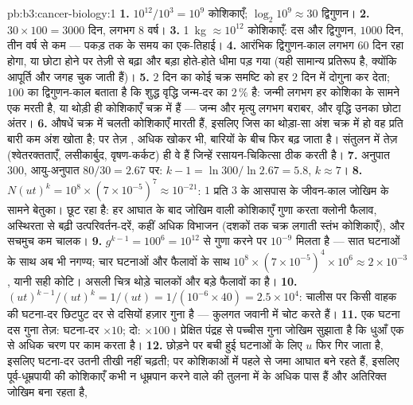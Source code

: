 \begin{solution}{pb:b3:cancer-biology:1}
\textbf{1.} $10^{12}/10^{3} = 10^{9}$ कोशिकाएँ; $\log_{2}10^{9} \approx 30$
द्विगुणन।
\textbf{2.} $30\times 100 = 3000$ दिन, लगभग $8$ वर्ष।
\textbf{3.} \qty{1}{kg} $\approx 10^{12}$ कोशिकाएँ: दस और द्विगुणन,
$1000$ दिन, तीन वर्ष से कम --- पकड़ तक के समय का एक-तिहाई।
\textbf{4.} आरंभिक द्विगुणन-काल लगभग $60$ दिन रहा होगा, या  छोटा
होने पर तेज़ी से बढ़ा और बड़ा होते-होते धीमा पड़ गया (यही सामान्य
प्रतिरूप है, क्योंकि आपूर्ति और जगह चुक जाती हैं)।
\textbf{5.} $2$ दिन का कोई चक्र समष्टि को हर $2$ दिन में दोगुना कर
देता; $100$ का द्विगुणन-काल बताता है कि शुद्ध वृद्धि जन्म-दर का
$2\,\%$ है: जन्मी लगभग हर कोशिका के सामने एक मरती है, या थोड़ी ही
कोशिकाएँ चक्र में हैं --- जन्म और मृत्यु लगभग बराबर, और वृद्धि उनका
छोटा अंतर।
\textbf{6.} औषधें चक्र में चलती कोशिकाएँ मारती हैं, इसलिए जिस 
का थोड़ा-सा अंश चक्र में हो वह प्रति बारी कम अंश खोता है; पर तेज़
, अधिक खोकर भी, बारियों के बीच फिर बढ़ जाता है। संतुलन में तेज़
 (श्वेतरक्तताएँ, लसीकार्बुद, वृषण-कर्कट) ही वे हैं जिन्हें
रसायन-चिकित्सा ठीक करती है।
\textbf{7.} अनुपात $300$, आयु-अनुपात $80/30 = 2.67$ पर: $k - 1 =
\ln 300/\ln 2.67 = 5.8$, $k \approx 7$।
\textbf{8.} $N(ut)^{k} = 10^{8}\times (7\times 10^{-5})^{7} \approx
10^{-21}$: $1$ प्रति $3$ के आसपास के जीवन-काल जोखिम के सामने बेतुका।
छूट रहा है: हर आघात के बाद जोखिम वाली कोशिकाएँ गुणा करता क्लोनी फैलाव,
अस्थिरता से बढ़ी उत्परिवर्तन-दरें, कहीं अधिक विभाजन (दशकों तक चक्र
लगाती स्तंभ कोशिकाएँ), और सचमुच कम चालक।
\textbf{9.} $g^{k-1} = 100^{6} = 10^{12}$ से गुणा करने पर $10^{-9}$
मिलता है --- सात घटनाओं के साथ अब भी नगण्य; चार घटनाओं और फैलावों के
साथ $10^{8}\times (7\times 10^{-5})^{4}\times 10^{6} \approx 2\times
10^{-3}$, यानी सही कोटि। असली चित्र थोड़े चालकों और बड़े फैलावों का है।
\textbf{10.} $(ut)^{k-1}/(ut)^{k} = 1/(ut) = 1/(10^{-6}\times 40) =
2.5\times 10^{4}$: चालीस पर किसी वाहक की घटना-दर छिटपुट दर से दसियों
हज़ार गुना है --- कुलगत  जवानी में चोट करते हैं।
\textbf{11.} एक घटना दस गुना तेज़: घटना-दर $\times 10$; दो:
$\times 100$। प्रेक्षित पंद्रह से पच्चीस गुना जोखिम सुझाता है कि धुआँ
एक से अधिक चरण पर काम करता है।
\textbf{12.} छोड़ने पर बची हुई घटनाओं के लिए $u$ फिर गिर जाता है,
इसलिए घटना-दर उतनी तीखी नहीं चढ़ती; पर कोशिकाओं में पहले से जमा आघात
बने रहते हैं, इसलिए पूर्व-धूम्रपायी की कोशिकाएँ कभी न धूम्रपान करने
वाले की तुलना में  के अधिक पास हैं और अतिरिक्त जोखिम बना रहता है,

\end{solution}
